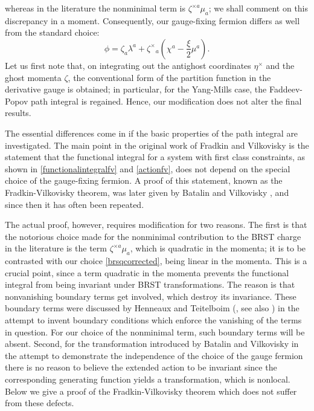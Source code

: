 \documentclass[a4paper,10pt]{article}
\begin{document}
whereas in the literature the nonminimal term is $\zeta^{\times a}\mu_a$; we shall 
comment on this discrepancy in a moment. Consequently, our gauge-fixing fermion differs  
as well from the standard choice:
\begin{equation}\label{gaugefixingfermionfinalversion}
\phi=\zeta_a\lambda^a+\zeta^{\times}{\!}_a(\chi^a-\frac{\xi}{2}\mu^a).
\end{equation}
Let us first note that, on integrating out the antighost coordinates $\eta^{\times}$ 
and the ghost momenta $\zeta$, the conventional form of the partition function in the 
derivative gauge is obtained; in particular, for the Yang-Mills case, the Faddeev-Popov 
path integral \cite{Fadd 67,Fadd 80} is regained. Hence, our modification does not alter 
the final results.

The essential differences come in if the basic properties of the path integral are 
investigated. The main point in the original work of Fradkin and Vilkovisky \cite{Frad 
75} is the statement that the functional integral for a system with first class 
constraints, as shown in \eqref{functionalintegralfv} and \eqref{actionfv}, does not 
depend on the special choice of the gauge-fixing fermion. A proof of this statement, 
known as the Fradkin-Vilkovisky theorem, was later given by Batalin and Vilkovisky 
\cite{Bata 77}, and since then it has often been repeated. 

The actual proof, however, requires modification for two reasons. The first is that the 
notorious choice made for the nonminimal contribution to the BRST 
charge in the literature is the term $\zeta^{\times a}\mu_a$, which is quadratic in the momenta; it is to 
be contrasted with our choice \eqref{brsqcorrected}, being linear in the momenta. This is 
a crucial point, since a term quadratic in the momenta prevents the functional integral 
from being invariant under BRST transformations. The reason is that nonvanishing boundary 
terms get involved, which destroy its invariance. These boundary terms were discussed by 
Henneaux and Teitelboim (\cite{Henn 85,Henn 92,Henn 92a}, see also \cite{Fadd 69}) in the 
attempt to invent boundary conditions which enforce the vanishing of the terms in 
question. For our choice of the nonminimal term, such boundary terms will be absent. 
Second, for the transformation introduced by Batalin and Vilkovisky in the attempt to 
demonstrate the independence of the choice of the gauge fermion there is no reason to 
believe the extended action to be invariant since the corresponding generating function 
yields a transformation, which is nonlocal. Below we give a proof of the 
Fradkin-Vilkovisky theorem which does not suffer from these defects.
\end{document}
